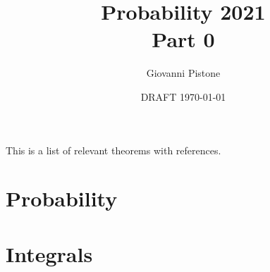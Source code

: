 \documentclass[12pt,a4paper]{amsart}
\title{Probability 2021 \\ Part 0
}
\author[G. Pistone]{Giovanni Pistone}
\date{DRAFT \today}
\theoremstyle{plain}%
\theoremstyle{definition}
\theoremstyle{remark}
\begin{document}
\maketitle
\tableofcontents

This is a list of relevant theorems with references.

\section{Probability}
\label{sec:probability}

\section{Integrals}
\label{sec:integrals}



\end{document}
